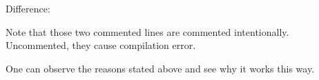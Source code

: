 	\begin{paracol}{2}
		
		\switchcolumn
		Difference:
		\begin{compactitem}
			\item Note that those two commented lines are commented intentionally. Uncommented, they cause compilation error.
			
			\item One can observe the reasons stated above and see why it works this way.
		\end{compactitem}
	\end{paracol}




